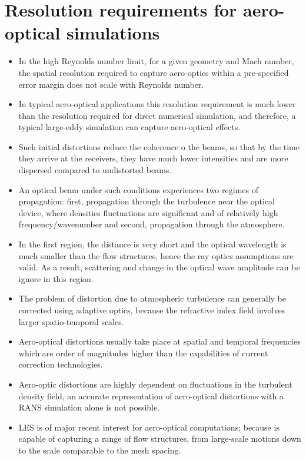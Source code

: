     \section{Resolution requirements for aero-optical simulations \cite{mani:jocp:2008}}
        \begin{itemize}
            \item In the high Reynolds number limit, for a given geometry and Mach number, the spatial resolution required to capture aero-optics within a pre-specified error margin does not scale with Reynolds number. 
            \item In typical aero-optical applications this resolution requirement is much lower than the resolution required for direct numerical simulation, and therefore, a typical large-eddy simulation can capture aero-optical effects. 
            \item Such initial distortions reduce the coherence o the beams, so that by the time they arrive at the receivers, they have much lower intensities and are more dispersed compared to undistorted beams. 
            \item An optical beam under such conditions experiences two regimes of propagation: first, propagation through the turbulence near the optical device, where densities fluctuations are significant and of relatively high frequency/wavenumber and second, propagation through the atmosphere. 
            \item In the first region, the distance is very short and the optical wavelength is much smaller than the flow structures, hence the ray optics assumptions are valid. As a result, scattering and change in the optical wave amplitude can be ignore in this region.
            \item The problem of distortion due to atmospheric turbulence can generally be corrected using adaptive optics, because the refractive index field involves larger spatio-temporal scales. 
            \item Aero-optical distortions usually take place at spatial and temporal frequencies which are order of magnitudes higher than the capabilities of current correction technologies. 
            \item Aero-optic distortions are highly dependent on fluctuations in the turbulent density field, an accurate representation of aero-optical distortions with a RANS simulation alone is not possible. 
            \item LES is of major recent interest for aero-optical computations; because is capable of capturing a range of flow structures, from large-scale motions down to the scale comparable to the mesh spacing.

\end{itemize}
